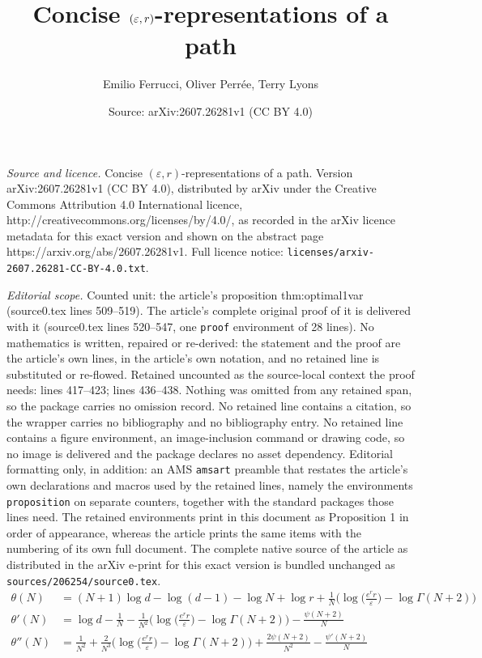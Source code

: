 \documentclass[10pt,a4paper]{amsart}
\title{Concise $(\eps,r)$-representations of a path}
\author{Emilio Ferrucci, Oliver Perr\'ee, Terry Lyons}
\date{Source: arXiv:2607.26281v1 (CC BY 4.0)}
\def\eps{\varepsilon}
\begin{document}
\maketitle

\noindent\emph{Source and licence.} Concise $(\eps,r)$-representations of a path. Version arXiv:2607.26281v1 (CC BY 4.0), distributed by arXiv under the Creative Commons Attribution 4.0 International licence, http://creativecommons.org/licenses/by/4.0/, as recorded in the arXiv licence metadata for this exact version and shown on the abstract page https://arxiv.org/abs/2607.26281v1. Full licence notice: \texttt{licenses/arxiv-2607.26281-CC-BY-4.0.txt}.\par\smallskip

\noindent\textit{Editorial scope.} Counted unit: the article's proposition thm:optimal1var (source0.tex lines 509--519). The article's complete original proof of it is delivered with it (source0.tex lines 520--547, one \texttt{proof} environment of 28 lines). No mathematics is written, repaired or re-derived: the statement and the proof are the article's own lines, in the article's own notation, and no retained line is substituted or re-flowed.  Retained uncounted as the source-local context the proof needs: lines 417--423; lines 436--438.  Nothing was omitted from any retained span, so the package carries no omission record.  No retained line contains a citation, so the wrapper carries no bibliography and no bibliography entry.  No retained line contains a figure environment, an image-inclusion command or drawing code, so no image is delivered and the package declares no asset dependency.  Editorial formatting only, in addition: an AMS \texttt{amsart} preamble that restates the article's own declarations and macros used by the retained lines, namely the environments \texttt{proposition} on separate counters, together with the standard packages those lines need.  The retained environments print in this document as Proposition 1 in order of appearance, whereas the article prints the same items with the numbering of its own full document.  The complete native source of the article as distributed in the arXiv e-print for this exact version is bundled unchanged as \texttt{sources/206254/source0.tex}.
\begin{equation}\label{eq:theta}
\begin{split}
	\theta(N) &= (N+1)\log d - \log(d-1) - \log N + \log r + \frac 1N \Big( \log \Big(\frac{e^r r}{\eps}\Big) - \log \Gamma(N+2) \Big) \\
	\theta'(N) &= \log d -\frac 1N -\frac{1}{N^2} \Big( \log \Big(\frac{e^r r}{\eps}\Big) - \log \Gamma(N+2) \Big) -\frac{\psi(N+2)}{N} \\
	\theta''(N) &= \frac{1}{N^2} +\frac{2}{N^3} \Big( \log \Big(\frac{e^r r}{\eps}\Big) - \log \Gamma(N+2) \Big) +\frac{2\psi(N+2)}{N^{2}} -\frac{\psi'(N+2)}{N}
\end{split}
\end{equation}
\end{document}
